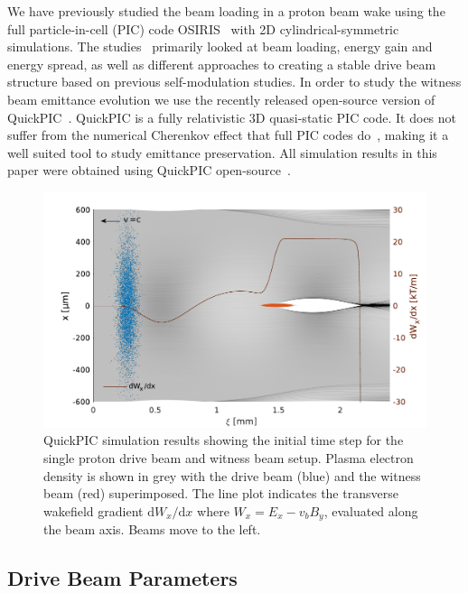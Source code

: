 \documentclass[aps,prstab,reprint,amsmath,amssymb,groupedaddress]{revtex4-1}
\begin{document}
We have previously studied the beam loading in a proton beam wake using the full particle-in-cell (PIC) code OSIRIS~\cite{fonseca:2002} with 2D cylindrical-symmetric simulations. The studies~\cite{berglyd_olsen:2015, berglyd_olsen:2016} primarily looked at beam loading, energy gain and energy spread, as well as different approaches to creating a stable drive beam structure based on previous self-modulation studies. In order to study the witness beam emittance evolution we use the recently released open-source version of QuickPIC~\cite{huang:2006, an:2013}. QuickPIC is a fully relativistic 3D quasi-static PIC code. It does not suffer from the numerical Cherenkov effect that full PIC codes do~\cite{godfrey:1974,lehe:2013}, making it a well suited tool to study emittance preservation. All simulation results in this paper were obtained using QuickPIC open-source~\cite{quickpic:web}.

\begin{figure}[hbt]
    \includegraphics[width=\linewidth,trim={2mm 0mm 2mm 0mm},clip]{figures/plasmaDenTWake}
    \caption{\label{Fig:PlasmaDenTWake} QuickPIC simulation results showing the initial time step for the single proton drive beam and witness beam setup. Plasma electron density is shown in grey with the drive beam (blue) and the witness beam (red) superimposed. The line plot indicates the transverse wakefield gradient $\textrm{d}W_{x}/\textrm{d}x$ where $W_{x} = E_{x} - v_{b} B_{y}$, evaluated along the beam axis. Beams move to the left.}
\end{figure}

\subsection{Drive Beam Parameters}\label{S:M:Setup}
\end{document}
